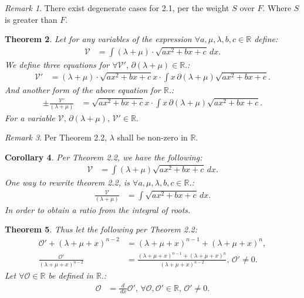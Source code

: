 \documentclass[10pt]{article}
\theoremstyle{plain}
\newtheorem{theorem}{Theorem}[section]
\newtheorem{corollary}[theorem]{Corollary}
\theoremstyle{definition}
\theoremstyle{remark}
\newtheorem{remark}[theorem]{Remark}
\begin{document}
\begin{remark}
	There exist degenerate cases for 2.1, per the weight $S$ over $F$. Where $S$ is greater than $F$.
\end{remark}

\begin{theorem}
	Let for any variables of the expression $\forall a, \mu, \lambda, b, c \in \mathbb{R}$ define:
	\begin{align*}
		\mathcal{V} &= \int (\lambda + \mu) \cdot \sqrt{ax^2 + bx + c} \, dx.
	\end{align*}
	We define three equations for $\forall \mathcal{V}', \, \partial(\lambda + \mu) \in \mathbb{R}.$:
	\begin{align*}
		\mathcal{V}' &= (\lambda + \mu) \cdot  \sqrt{ax^2 + bx + c}x \cdot  \int x \, \partial(\lambda + \mu)\sqrt{ax^2 + bx  +c}.
	\end{align*}
	And another form of the above equation for $\mathbb{R}$.:
	\begin{align*}
		\pm \frac{\mathcal{V}'}{(\lambda + \mu)} &= \sqrt{ax^2 + bx + c}x \cdot  \int x \, \partial(\lambda + \mu)\sqrt{ax^2 + bx  +c}.
	\end{align*}
	For a variable $\mathcal{V}, \, \partial(\lambda + \mu), \, \mathcal{V}' \in \mathbb{R}.$
\end{theorem}

\begin{remark}
	Per Theorem 2.2, $\lambda$ shall be non-zero in $\mathbb{R}.$
\end{remark}

\begin{corollary}
	Per Theorem 2.2, we have the following:
	\begin{align*}
		\mathcal{V} &= \int (\lambda + \mu)\sqrt{ax^2 + bx + c} \, dx.
	\end{align*}
	One way to rewrite theorem 2.2, is $\forall a, \mu, \lambda, b, c \in \mathbb{R}$.:
	\begin{align*}
		\frac{\mathcal{V}}{(\lambda + \mu)} &= \int \sqrt{ax^2 + bx + c} \, dx.
	\end{align*}
	In order to obtain a ratio from the integral of roots.
\end{corollary}

\begin{theorem}
	Thus let the following per Theorem 2.2:
	\begin{align*}
		\mathcal{O}' + (\lambda + \mu + x)^{n-2} &= (\lambda + \mu + x)^{n-1} + (\lambda + \mu + x)^{n},\\
		\frac{\mathcal{O}'}{(\lambda + \mu + x)^{n-2}} &= \frac{(\lambda + \mu + x)^{n-1} + (\lambda + \mu + x)^{n}}{(\lambda + \mu + x)^{n-2}}, \, \mathcal{O}' \neq 0.
	\end{align*}
	Let $\forall \mathcal{O} \in \mathbb{R}$ be defined in $\mathbb{R}.$:
	\begin{align*}
		\mathcal{O} &= \frac{d}{\, dx} \mathcal{O}', \, \forall \mathcal{O}, \mathcal{O}' \in \mathbb{R}, \, \mathcal{O}' \neq 0.
	\end{align*}
\end{theorem}
\end{document}
